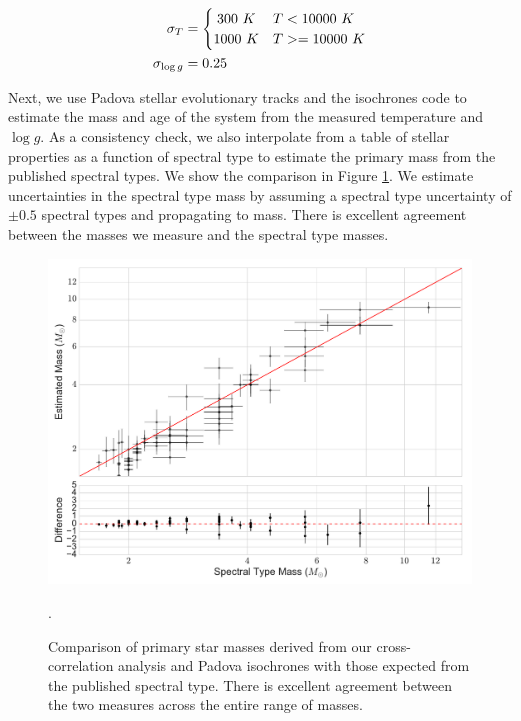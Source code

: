 \documentclass{emulateapj}
\begin{document}
\begin{align}
 \sigma_T &= \begin{cases}
      \hfill 300\ K \hfill & T < 10000\ K \\
      \hfill 1000\ K \hfill & T >= 10000\ K \\
     \end{cases} \\
 \sigma_{\log{g}} &= 0.25
\end{align}

Next, we use Padova stellar evolutionary tracks \citep{Bressan2012} and the isochrones code \citep{isochrones_code} to estimate the mass and age of the system from the measured temperature and $\log{g}$. As a consistency check, we also interpolate from a table of stellar properties as a function of spectral type \citep{Pecaut2013} to estimate the primary mass from the published spectral types. We show the comparison in Figure \ref{fig:prim_mass}. We estimate uncertainties in the spectral type mass by assuming a spectral type uncertainty of $\pm 0.5$ spectral types and propagating to mass. There is excellent agreement between the masses we measure and the spectral type masses.

\begin{figure}
\includegraphics[width=\columnwidth]{PrimaryMassEstimates_log.pdf}
\caption{Comparison of primary star masses derived from our cross-correlation analysis and Padova isochrones \citep{Bressan2012} with those expected from the published spectral type. There is excellent agreement between the two measures across the entire range of masses.}
\label{fig:prim_mass}.
\end{figure}
\end{document}
